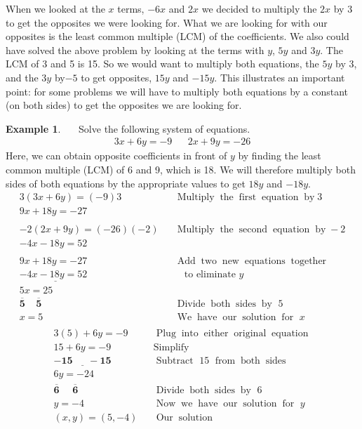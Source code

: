 \documentclass[12pt]{book}
\theoremstyle{definition}
\newtheorem{example}{Example}
\newcommand{\tmmathbf}[1]{\ensuremath{\boldsymbol{#1}}}
\newcommand{\tmop}[1]{\ensuremath{\operatorname{#1}}}
\begin{document}
When we looked at the $x$ terms, $- 6 x$ and $2 x$ we decided to multiply the $2 x$ by 3 to get the opposites we were looking for. What we are looking for with our opposites is the least common multiple (LCM) of the coefficients. We also could have solved the above problem by looking at the terms with $y$, $5y$ and $3y$. The LCM of 3 and 5 is 15. So we would want to multiply both equations, the $5 y$ by 3, and the $3 y$ by$- 5$ to get opposites, $15 y$ and $- 15 y$. This illustrates an important point: for some problems we will have to multiply both equations by a constant (on both sides) to get the opposites we are looking for.
\begin{example}~~~Solve the following system of equations.
  \begin{eqnarray*}
	3 x + 6 y = - 9 & & 2 x + 9 y = - 26
	\end{eqnarray*}
Here, we can obtain opposite coefficients in front of $y$ by finding the least common multiple (LCM) of 6 and 9, which is 18.  We will therefore multiply both sides of both equations by the appropriate values to get $18y$ and $-18y$.
\begin{eqnarray*}
    3 (3 x + 6 y) = (- 9) 3 &  & \tmop{Multiply} \tmop{the} \tmop{first}
    \tmop{equation} \tmop{by} 3\\
    9 x + 18 y = - 27~~ &  & \\
    &  & \\
    - 2 (2 x + 9 y) = (- 26) (- 2) &  & \tmop{Multiply} \tmop{the}
    \tmop{second} \tmop{equation} \tmop{by} - 2\\
    - 4 x - 18 y = 52~~~~~~~~~~~ &  & \\
    &  & \\
    9 x + 18 y = - 27 &  & \tmop{Add} \tmop{two} \tmop{new} \tmop{equations}
    \tmop{together}\\
    \underline{- 4 x - 18 y = 52~~} &  & \text{~~~to eliminate~} y\\
    5 x = 25~~ &  & \\
    \tmmathbf{\overline{5} ~~~~~ \overline{5}}~~~ &  & \tmop{Divide} \tmop{both} \tmop{sides} \tmop{by~} 5\\
    x = 5~~~ &  & \tmop{We} \tmop{have} \tmop{our} \tmop{solution} \tmop{for~} x\\
\end{eqnarray*}
\begin{eqnarray*}
    3 (5) + 6 y = - 9~ &  & \tmop{Plug} \tmop{into} \tmop{either}
    \tmop{original} \tmop{equation}\\
    15 + 6 y = - 9~ &  & \tmop{Simplify}\\
    \tmmathbf{\underline{- 15 ~~~~~~~- 15}} &  &\tmop{Subtract~} 15 \tmop{~from} \tmop{both}
    \tmop{sides}\\
    6 y = - 24 &  & \\
    \tmmathbf{\overline{6} ~~~~~~ \overline{6}}~~ &  & \tmop{Divide} \tmop{both} \tmop{sides} \tmop{by~} 6\\
    y = - 4~~ &  & \tmop{Now} \tmop{we} \tmop{have} \tmop{our} \tmop{solution}
    \tmop{for~} y\\
    (x,y)=(5, - 4) &  & \tmop{Our} \tmop{solution}
  \end{eqnarray*}
\end{example}
\end{document}
